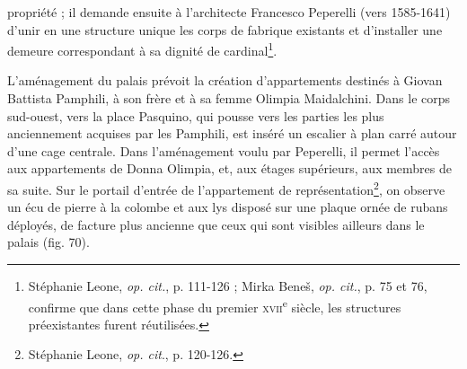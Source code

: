 \documentclass[12pt,twoside,openany]{book}
\begin{document}
propriété ; il demande ensuite à l’architecte Francesco Peperelli (vers 1585-1641) d’unir en une structure unique les corps de fabrique existants et d’installer une demeure correspondant à sa dignité de cardinal\footnote{Stéphanie Leone, \textit{op. cit.}, p. 111-126 ; Mirka Beneš, \textit{op. cit.}, p. 75 et 76, confirme que dans cette phase du premier \textsc{xvii}\textsuperscript{e} siècle, les structures préexistantes furent réutilisées.}.

L’aménagement du palais prévoit la création d’appartements destinés à Giovan Battista Pamphili, à son frère et à sa femme Olimpia Maidalchini. Dans le corps sud-ouest, vers la place Pasquino, qui pousse vers les parties les plus anciennement acquises par les Pamphili, est inséré un escalier à plan carré autour d’une cage centrale. Dans l’aménagement voulu par Peperelli, il permet l’accès aux appartements de Donna Olimpia, et, aux étages supérieurs, aux membres de sa suite. Sur le portail d’entrée de l’appartement de représentation\footnote{Stéphanie Leone, \textit{op. cit}., p. 120-126.}, on observe un écu de pierre à la colombe et aux lys disposé sur une plaque ornée de rubans déployés, de facture plus ancienne que ceux qui sont visibles ailleurs dans le palais (fig. 70).
\end{document}
